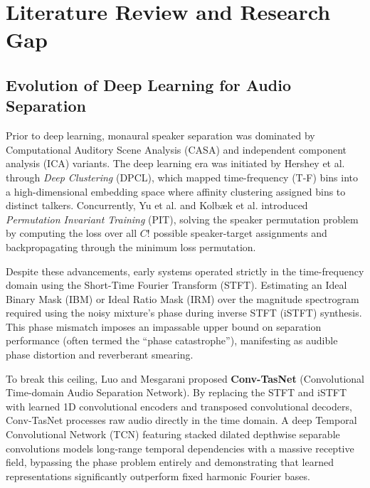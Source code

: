 \documentclass[11pt,a4paper]{report}
\begin{document}
\chapter{Literature Review and Research Gap}
\label{chap:lit_review}

\section{Evolution of Deep Learning for Audio Separation}
Prior to deep learning, monaural speaker separation was dominated by Computational Auditory Scene Analysis (CASA) \cite{wang2006computational} and independent component analysis (ICA) variants. The deep learning era was initiated by Hershey et al. \cite{hershey2016deep} through \textit{Deep Clustering} (DPCL), which mapped time-frequency (T-F) bins into a high-dimensional embedding space where affinity clustering assigned bins to distinct talkers. Concurrently, Yu et al. \cite{yu2017permutation} and Kolb{\ae}k et al. \cite{kolbaek2017multitalker} introduced \textit{Permutation Invariant Training} (PIT), solving the speaker permutation problem by computing the loss over all $C!$ possible speaker-target assignments and backpropagating through the minimum loss permutation.

Despite these advancements, early systems operated strictly in the time-frequency domain using the Short-Time Fourier Transform (STFT). Estimating an Ideal Binary Mask (IBM) or Ideal Ratio Mask (IRM) over the magnitude spectrogram required using the noisy mixture's phase during inverse STFT (iSTFT) synthesis. This phase mismatch imposes an impassable upper bound on separation performance (often termed the ``phase catastrophe''), manifesting as audible phase distortion and reverberant smearing.

To break this ceiling, Luo and Mesgarani \cite{luo2019conv} proposed \textbf{Conv-TasNet} (Convolutional Time-domain Audio Separation Network). By replacing the STFT and iSTFT with learned 1D convolutional encoders and transposed convolutional decoders, Conv-TasNet processes raw audio directly in the time domain. A deep Temporal Convolutional Network (TCN) featuring stacked dilated depthwise separable convolutions models long-range temporal dependencies with a massive receptive field, bypassing the phase problem entirely and demonstrating that learned representations significantly outperform fixed harmonic Fourier bases.
\end{document}
